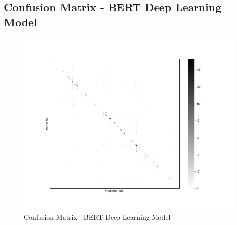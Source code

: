 \documentclass[12pt, a4paper, titlepage]{article}
\begin{document}
\subsection*{Confusion Matrix - BERT Deep Learning Model}
\begin{figure}[hb!]
  \center
  \includegraphics[scale=0.5]{cm_bert_clf_3.jpg}
  \caption{\label{fig: F26} Confusion Matrix - BERT Deep Learning Model}
\end{figure}

\newpage
\end{document}
